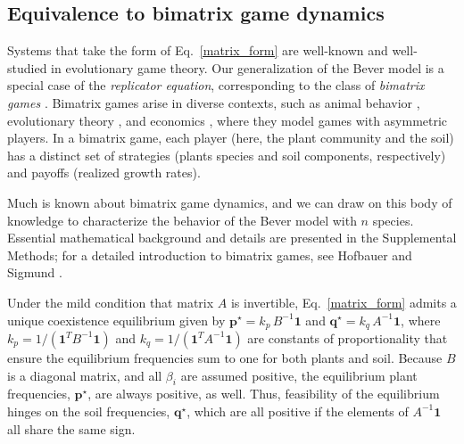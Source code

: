 \documentclass[11pt]{article}
\begin{document}
\subsection{Equivalence to bimatrix game dynamics}

Systems that take the form of Eq.~\ref{matrix_form} are well-known and well-studied in evolutionary game theory. Our generalization of the Bever model is a special case of the \emph{replicator equation}, corresponding to the class of \emph{bimatrix games} \citep{taylor1979evolutionarily,hofbauer1996evolutionary,hofbauer1998evolutionary,cressman2014replicator}. Bimatrix games arise in diverse contexts, such as animal behavior \citep{taylor1979evolutionarily,selten1988note}, evolutionary theory \citep{hofbauer1998evolutionary,cressman2014replicator}, and economics \citep{friedman1991evolutionary}, where they model games with asymmetric players. In a bimatrix game, each player (here, the plant community and the soil) has a distinct set of strategies (plants species and soil components, respectively) and payoffs (realized growth rates).

Much is known about bimatrix game dynamics, and we can draw on this body of knowledge to characterize the behavior of the Bever model with $n$ species. Essential mathematical background and details are presented in the Supplemental Methods; for a detailed introduction to bimatrix games, see Hofbauer and Sigmund \citep{hofbauer1998evolutionary}.

Under the mild condition that matrix $A$ is invertible, Eq.~\ref{matrix_form} admits a unique coexistence equilibrium given by $\bm{p}^\star = k_p \, B^{-1} \bm{1}$ and $\bm{q}^\star = k_q \, A^{-1} \bm{1}$, where $k_p = 1 / (\bm{1}^T B^{-1} \bm{1})$ and $k_q = 1 / (\bm{1}^T A^{-1} \bm{1})$ are constants of proportionality that ensure the equilibrium frequencies sum to one for both plants and soil. Because $B$ is a diagonal matrix, and all $\beta_i$ are assumed positive, the equilibrium plant frequencies, $\bm{p}^\star$, are always positive, as well. Thus, feasibility of the equilibrium hinges on the soil frequencies, $\bm{q}^\star$, which are all positive if the elements of $A^{-1} \bm{1}$ all share the same sign.
\end{document}
